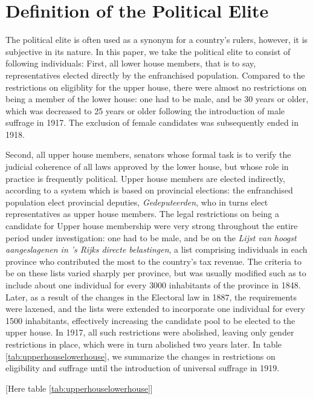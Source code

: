 \section{Definition of the Political Elite}
    The political elite is often used as a synonym for a country's rulers, however, it is subjective in its nature. In this paper, we take the political elite to consist of following individuals: First, all lower house members, that is to say, representatives elected directly by the enfranchised population. Compared to the restrictions on eligiblity for the upper house, there were almost no restrictions on being a member of the lower house: one had to be male, and be 30 years or older, which was decreased to 25 years or older following the introduction of male suffrage in 1917. The exclusion of female candidates was subsequently ended in 1918. \autocite{van2018tussen} 

    Second, all upper house members, senators whose formal task is to verify the judicial coherence of all laws approved by the lower house, but whose role in practice is frequently political.\autocite{van1999eerste} Upper house members are elected indirectly, according to a system which is based on provincial elections: the enfranchised population elect provincial deputies, \textit{Gedeputeerden}, who in turns elect representatives as upper house members. The legal restrictions on being a candidate for Upper house membership were very strong throughout the entire period under investigation: one had to be male, and be on the \textit{Lijst van hoogst aangeslagenen in 's Rijks directe belastingen}, a list comprising individuals in each province who contributed the most to the country's tax revenue. \autocite{moes1994lijsten} The criteria to be on these lists varied sharply per province, but was usually modified such as to include about one individual for every 3000 inhabitants of the province in 1848. \autocite{moes2012onder} Later, as a result of the changes in the Electoral law in 1887, the requirements were laxened, and the lists were extended to incorporate one individual for every 1500 inhabitants, effectively increasing the candidate pool to be elected to the upper house. In 1917, all such restrictions were abolished, leaving only gender restrictions in place, which were in turn abolished two years later. In table \ref{tab:upperhouselowerhouse}, we summarize the changes in restrictions on eligibility and suffrage until the introduction of universal suffrage in 1919. 
    
    \begin{center}
        [Here table \ref{tab:upperhouselowerhouse}]
    \end{center}


